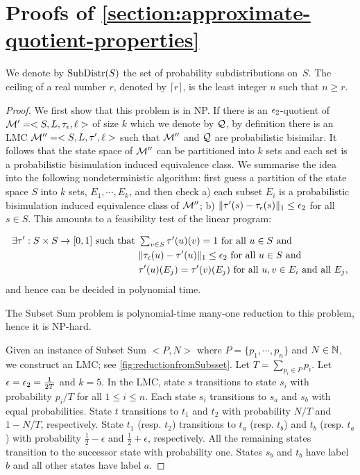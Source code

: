 \section{Proofs of \cref{section:approximate-quotient-properties}}\label{appendix: global-bisimulation-properties}

We denote by $\mathrm{SubDistr}(S)$ the set of probability subdistributions on~$S$. The ceiling of a real number $r$, denoted by $\lceil r\rceil$, is the least integer $n$ such that $n \ge r$.

\theoremMinimumApproximateQuotientNPComplete*

\begin{proof}
	We first show that this problem is in {\sf NP}. If there is an $\epsilon_2$-quotient of $\mathcal{M}' =<S, L,\tau_{\epsilon},\ell>$ of size $k$ which we denote by $\mathcal{Q}$, by definition there is an LMC $\mathcal{M}'' = <S, L, \tau', \ell>$ such that $\mathcal{M}''$ and $\mathcal{Q}$ are probabilistic bisimilar. It follows that the state space of $\mathcal{M}''$ can be partitioned into $k$ sets and each set is a probabilistic bisimulation induced equivalence class. We summarise the idea into the following nondeterministic algorithm:  first guess a partition of the state space $S$ into $k$ sets, $E_1, \cdots, E_k$, and then check a) each subset $E_i$ is a probabilistic bisimulation induced equivalence class of $\mathcal{M}''$; b) $\|\tau'(s)-\tau_{\epsilon}(s)\|_1 \le \epsilon_2$ for all $s \in S$. This amounts to a feasibility test of the linear program:
	
	
	\begin{align*}
	\exists \tau': S\times S \to [0, 1] \text{ such that } %
	&\textstyle\sum_{v \in S} \tau'(u)(v) = 1 \text{ for all $u\in S$ and}\\
	&\|\tauHyp(u) -\tau'(u)\|_1 \le \errorParam \text{ for all $u \in S$ and}\\
	&\tau'(u)(E_j) = \tau'(v)(E_j) \text{ for all $u, v \in E_i$ and all $E_j$},
	\end{align*}
	and hence can be decided in polynomial time.  
	
	The Subset Sum problem is polynomial-time many-one reduction to this problem, hence it is {\sf NP}-hard. 
	
	Given an instance of Subset Sum $<P, N>$ where $P =\{p_1, \cdots, p_n\}$ and $N \in \mathbb{N}$, we construct an LMC; see \cref{fig:reductionfromSubsset}. Let $T = \sum_{p_i \in P} p_i$. Let $\epsilon = \epsilon_2 = \frac{1}{2T}$ and $k = 5$. In the LMC, state $s$ transitions to state $s_i$ with probability $p_i / T$ for all $1 \le  i \le n$. Each state $s_i$ transitions to $s_a$ and $s_b$ with equal probabilities. State $t$ transitions to $t_1$ and $t_2$ with probability $N / T$ and $1 - N / T$, respectively. State $t_1$ (resp. $t_2$) transitions to $t_a$ (resp. $t_b$) and $t_b$ (resp. $t_a$) with probability $\frac{1}{2} - \epsilon$ and $\frac{1}{2} + \epsilon$, respectively. All the remaining states transition to the successor state with probability one. States $s_b$ and $t_b$ have label $b$ and all other states have label $a$.  
	

\end{proof}
